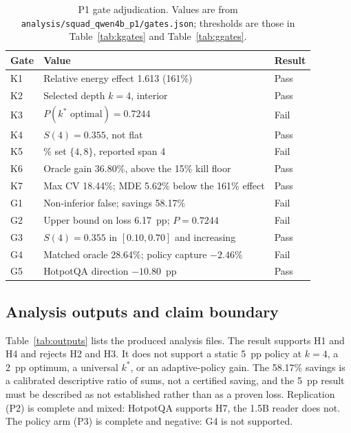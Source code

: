 \begin{table}[pos=htbp]
  \centering
  \caption{P1 gate adjudication. Values are from
  \texttt{analysis/squad\_qwen4b\_p1/gates.json}; thresholds are those in
  Table~\ref{tab:kgates} and Table~\ref{tab:ggates}.}
  \label{s:tab:p1gates}
  \small
  \setlength{\tabcolsep}{4pt}
  \begin{tabularx}{\textwidth}{>{\raggedright\arraybackslash}p{0.9cm}>{\raggedright\arraybackslash}p{8.6cm}>{\raggedright\arraybackslash}X}
    \toprule
    \textbf{Gate} & \textbf{Value} & \textbf{Result} \\
    \midrule
    K1 & Relative energy effect 1.613 (161\%) & Pass \\
    K2 & Selected depth $k=4$, interior & Pass \\
    K3 & $P(k^{*}\text{ optimal})=0.7244$ & Fail \\
    K4 & $S(4)=0.355$, not flat & Pass \\
    K5 & 95\% set $\{4,8\}$, reported span 4 & Fail \\
    K6 & Oracle gain 36.80\%, above the 15\% kill floor & Pass \\
    K7 & Max CV 18.44\%; MDE 5.62\% below the 161\% effect & Pass \\
    G1 & Non-inferior false; savings 58.17\% & Fail \\
    G2 & Upper bound on loss 6.17~pp; $P=0.7244$ & Fail \\
    G3 & $S(4)=0.355$ in $[0.10,0.70]$ and increasing & Pass \\
    G4 & Matched oracle 28.64\%; policy capture $-2.46\%$ & Fail \\
    G5 & HotpotQA direction $-10.80$~pp & Pass \\
    \bottomrule
  \end{tabularx}
\end{table}

\subsection{Analysis outputs and claim boundary}

Table~\ref{tab:outputs} lists the produced analysis files. The result supports H1 and H4 and
rejects H2 and H3. It does not support a static 5~pp policy at $k=4$, a 2~pp optimum, a universal
$k^{*}$, or an adaptive-policy gain. The 58.17\% savings is a calibrated descriptive ratio of
sums, not a certified saving, and the 5~pp result must be described as not established rather
than as a proven loss. Replication (P2) is complete and mixed: HotpotQA supports H7, the 1.5B
reader does not. The policy arm (P3) is complete and negative: G4 is not supported.

